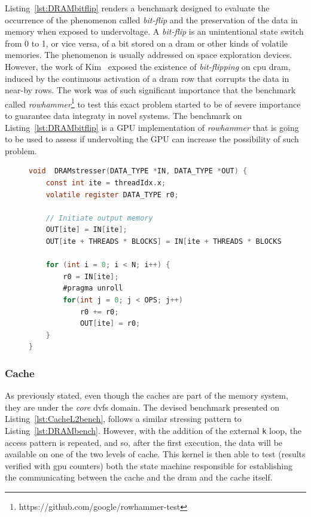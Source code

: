 Listing~\ref{lst:DRAMbitflip} renders a benchmark designed to evaluate the occurrence of the phenomenon called \textit{bit-flip} and the preservation of the data in memory when exposed to undervoltage. A \textit{bit-flip} is an unintentional state switch from 0 to 1, or vice versa, of a bit stored on a \acrshort{dram} or other kinds of volatile memories. The phenomenon is usually addressed on space exploration devices. However, the work of Kim~\cite{kim_flipping_2014} exposed the existence of \textit{bit-flipping} on \acrshort{cpu} \acrshort{dram}, induced by the continuous activation of a \acrshort{dram} row that corrupts the data in near-by rows. The work was of such significant importance that the benchmark called \textit{rowhammer}\footnote{https://github.com/google/rowhammer-test} to test this exact problem started to be of severe importance to guarantee data integraty in novel systems. The benchmark on Listing~\ref{lst:DRAMbitflip} is a GPU implementation of \textit{rowhammer} that is going to be used to assess if undervolting the GPU can increase the possibility of such problem.

\begin{figure}[h]
\begin{lstlisting}[language=C, caption=DRAM Bit-Flip Stress Test Code - \textit{rowhammer} inspired  benchmark, label=lst:DRAMbitflip, basicstyle=\footnotesize\ttfamily,abovecaptionskip=0pt, captionpos=b]
void  DRAMstresser(DATA_TYPE *IN, DATA_TYPE *OUT) {
    const int ite = threadIdx.x;
    volatile register DATA_TYPE r0;
    
    // Initiate output memory
    OUT[ite] = IN[ite];
    OUT[ite + THREADS * BLOCKS] = IN[ite + THREADS * BLOCKS];
    
    for (int i = 0; i < N; i++) {
        r0 = IN[ite];
        #pragma unroll
        for(int j = 0; j < OPS; j++)  
            r0 += r0;
            OUT[ite] = r0;
    }
}
\end{lstlisting}
\end{figure}


\subsubsection{Cache}

As previously stated, even though the caches are part of the memory system, they are under the \textit{core} \acrshort{dvfs} domain. The devised benchmark presented on   Listing~\ref{lst:CacheL2bench}, follows a similar stressing pattern to Listing~\ref{lst:DRAMbench}. However, with the addition of the external \texttt{k} loop, the access pattern is repeated, and so, after the first execution, the data will be available on one of the two levels of cache. This kernel is then able to test (results verified with \acrshort{gpu} counters) both the state machine responsible for establishing the communicating between the cache and the \acrshort{dram} and the cache itself.

